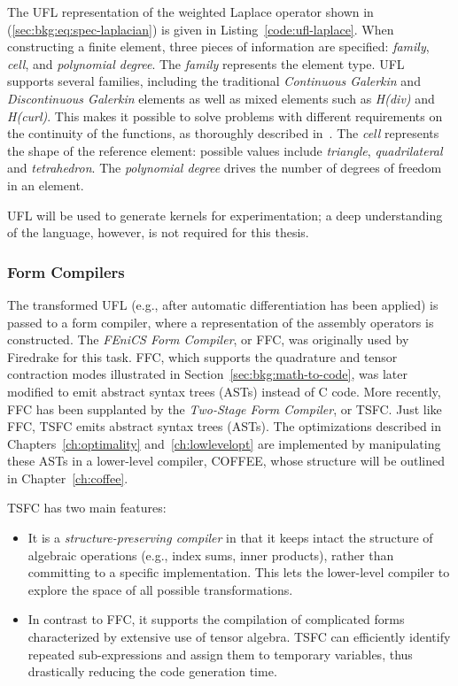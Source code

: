 The UFL representation of the weighted Laplace operator shown in (\ref{sec:bkg:eq:spec-laplacian}) is given in Listing~\ref{code:ufl-laplace}. When constructing a finite element, three pieces of information are specified: {\em family}, {\em cell}, and {\em polynomial degree}. The {\em family} represents the element type. UFL supports several families, including the traditional {\em Continuous Galerkin} and {\em Discontinuous Galerkin} elements as well as mixed elements such as {\em H(div)} and {\em H(curl)}. This makes it possible to solve problems with different requirements on the continuity of the functions, as thoroughly described in~\cite{Fenics}. The {\em cell} represents the shape of the reference element: possible values include {\em triangle}, {\em quadrilateral} and {\em tetrahedron}. The {\em polynomial degree} drives the number of degrees of freedom in an element.

UFL will be used to generate kernels for experimentation; a deep understanding of the language, however, is not required for this thesis.


\subsubsection{Form Compilers}
\label{sec:bkg:form-compilers}
The transformed UFL (e.g., after automatic differentiation has been applied) is passed to a form compiler, where a representation of the assembly operators is constructed. The {\em FEniCS Form Compiler}, or FFC, was originally used by Firedrake for this task. FFC, which supports the quadrature and tensor contraction modes illustrated in Section~\ref{sec:bkg:math-to-code}, was later modified to emit abstract syntax trees (ASTs) instead of C code. More recently, FFC has been supplanted by the {\em Two-Stage Form Compiler}, or TSFC. Just like FFC, TSFC emits abstract syntax trees (ASTs). The optimizations described in Chapters~\ref{ch:optimality} and~\ref{ch:lowlevelopt} are implemented by manipulating these ASTs in a lower-level compiler, COFFEE, whose structure will be outlined in Chapter~\ref{ch:coffee}.

TSFC has two main features:
\begin{itemize}
\item It is a \textit{structure-preserving compiler} in that it keeps intact the structure of algebraic operations (e.g., index sums, inner products), rather than committing to a specific implementation. This lets the lower-level compiler to explore the space of all possible transformations.
\item In contrast to FFC, it supports the compilation of complicated forms characterized by extensive use of tensor algebra. TSFC can efficiently identify repeated sub-expressions and assign them to temporary variables, thus drastically reducing the code generation time.
\end{itemize}

